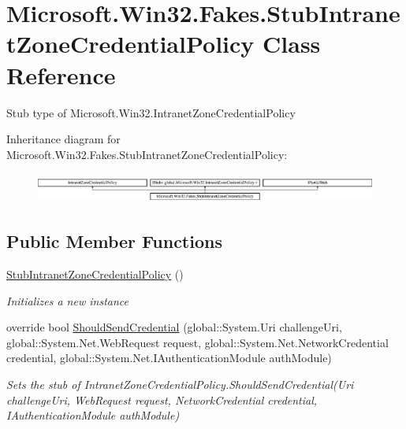 \hypertarget{class_microsoft_1_1_win32_1_1_fakes_1_1_stub_intranet_zone_credential_policy}{\section{Microsoft.\-Win32.\-Fakes.\-Stub\-Intranet\-Zone\-Credential\-Policy Class Reference}
\label{class_microsoft_1_1_win32_1_1_fakes_1_1_stub_intranet_zone_credential_policy}
}


Stub type of Microsoft.\-Win32.\-Intranet\-Zone\-Credential\-Policy 


Inheritance diagram for Microsoft.\-Win32.\-Fakes.\-Stub\-Intranet\-Zone\-Credential\-Policy\-:\begin{figure}[H]
\begin{center}
\leavevmode
\includegraphics[height=1.006289cm]{class_microsoft_1_1_win32_1_1_fakes_1_1_stub_intranet_zone_credential_policy}
\end{center}
\end{figure}
\subsection*{Public Member Functions}
\begin{DoxyCompactItemize}
\item 
\hyperlink{class_microsoft_1_1_win32_1_1_fakes_1_1_stub_intranet_zone_credential_policy_acc7d24915d046092ebc2b13cd0f8943c}{Stub\-Intranet\-Zone\-Credential\-Policy} ()
\begin{DoxyCompactList}\small\item\em Initializes a new instance\end{DoxyCompactList}\item 
override bool \hyperlink{class_microsoft_1_1_win32_1_1_fakes_1_1_stub_intranet_zone_credential_policy_a5404e76589d74aa2d409e24c34c11a47}{Should\-Send\-Credential} (global\-::\-System.\-Uri challenge\-Uri, global\-::\-System.\-Net.\-Web\-Request request, global\-::\-System.\-Net.\-Network\-Credential credential, global\-::\-System.\-Net.\-I\-Authentication\-Module auth\-Module)
\begin{DoxyCompactList}\small\item\em Sets the stub of Intranet\-Zone\-Credential\-Policy.\-Should\-Send\-Credential(\-Uri challenge\-Uri, Web\-Request request, Network\-Credential credential, I\-Authentication\-Module auth\-Module)\end{DoxyCompactList}\end{DoxyCompactItemize}

